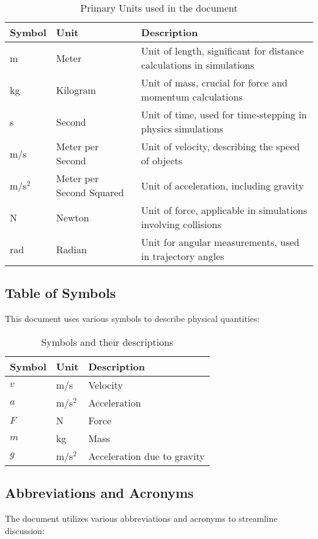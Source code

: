\documentclass[12pt]{article}
\begin{document}
\begin{table}[H]
\centering
\begin{tabular}{|l|l|l|}
\hline
\textbf{Symbol} & \textbf{Unit} & \textbf{Description} \\
\hline
m & Meter & Unit of length, significant for distance calculations in simulations \\
kg & Kilogram & Unit of mass, crucial for force and momentum calculations \\
s & Second & Unit of time, used for time-stepping in physics simulations \\
m/s & Meter per Second & Unit of velocity, describing the speed of objects \\
m/s$^2$ & Meter per Second Squared & Unit of acceleration, including gravity \\
N & Newton & Unit of force, applicable in simulations involving collisions \\
rad & Radian & Unit for angular measurements, used in trajectory angles \\
\hline
\end{tabular}
\caption{Primary Units used in the document}
\label{table:units_corrected}
\end{table}

\subsection{Table of Symbols}
This document uses various symbols to describe physical quantities:

\begin{table}[H]
\centering
\begin{tabular}{|l|l|l|}
\hline
\textbf{Symbol} & \textbf{Unit} & \textbf{Description} \\
\hline
$v$ & m/s & Velocity \\
$a$ & m/s$^2$ & Acceleration \\
$F$ & N & Force \\
$m$ & kg & Mass \\
$g$ & m/s$^2$ & Acceleration due to gravity \\
\hline
\end{tabular}
\caption{Symbols and their descriptions}
\label{table:symbols}
\end{table}

\subsection{Abbreviations and Acronyms}
The document utilizes various abbreviations and acronyms to streamline discussion:
\end{document}
